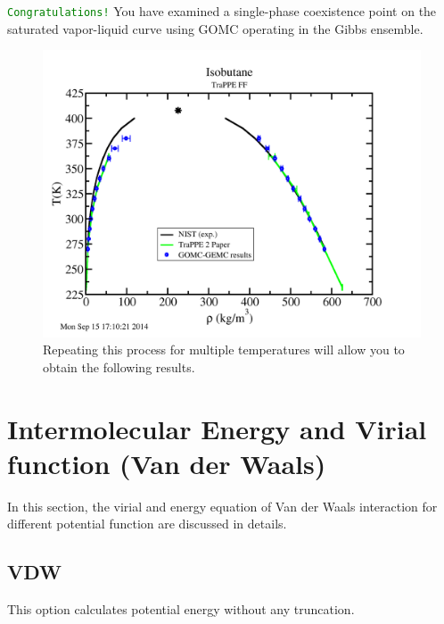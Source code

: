\textcolor{green}{\texttt{Congratulations!}} You have examined a single-phase coexistence point on the saturated vapor-liquid curve using GOMC operating in the Gibbs ensemble.
\begin{figure}[H]
\centering
\includegraphics[scale=0.5]{images/isobutane_result}
\caption{Repeating this process for multiple temperatures will allow you to obtain the following results.}
\end{figure}
\newpage

\section{Intermolecular Energy and Virial function (Van der Waals)}
In this section, the virial and energy equation of Van der Waals interaction for different potential function are discussed in details.
\subsection{VDW} This option calculates potential energy without any truncation.

